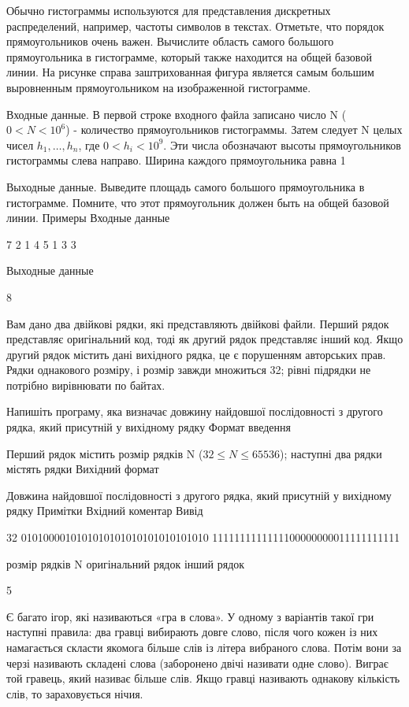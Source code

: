 \documentclass[]{article}
\begin{document}
Обычно гистограммы используются для представления дискретных распределений, например, частоты символов в текстах. Отметьте, что порядок прямоугольников очень важен. Вычислите область самого большого прямоугольника в гистограмме, который также находится на общей базовой линии. На рисунке справа заштрихованная фигура является самым большим выровненным прямоугольником на изображенной гистограмме.

Входные данные. В первой строке входного файла записано число N ($0 < N < 10^6$) - количество прямоугольников гистограммы. Затем следует N целых чисел $h_1,\ldots,h_n$, где $0<h_i<10^9$. Эти числа обозначают высоты прямоугольников гистограммы слева направо. Ширина каждого прямоугольника равна 1

Выходные данные. Выведите площадь самого большого прямоугольника в гистограмме. Помните, что этот прямоугольник должен быть на общей базовой линии.
Примеры
Входные данные

7 2 1 4 5 1 3 3

Выходные данные

8



Вам дано два двійкові рядки, які представляють двійкові файли. Перший рядок представляє оригінальний код, тоді як другий рядок представляє інший код. Якщо другий рядок містить дані вихідного рядка, це є порушенням авторських прав. Рядки однакового розміру, і розмір завжди множиться 32; рівні підрядки не потрібно вирівнювати по байтах.

Напишіть програму, яка визначає довжину найдовшої послідовності з другого рядка, який присутній у вихідному рядку
Формат введення

Перший рядок містить розмір рядків N ($32 \le N \le 65536$); наступні два рядки містять рядки
Вихідний формат

Довжина найдовшої послідовності з другого рядка, який присутній у вихідному рядку
Примітки
Вхідний коментар Вивід

32
0101000010101010101010101010101010
1111111111111100000000011111111111



розмір рядків N
оригінальний рядок
інший рядок



5



Є багато ігор, які називаються «гра в слова». У одному з варіантів такої гри наступні правила: два гравці вибирають довге слово, після чого кожен із них намагається скласти якомога більше слів із літера вибраного слова. Потім вони за черзі називають складені слова (заборонено двічі називати одне слово). Виграє той гравець, який називає більше слів. Якщо гравці називають однакову кількість слів, то зараховується нічия.
\end{document}
